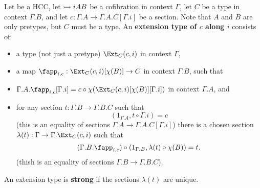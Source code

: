 \documentclass{amsart}
\begin{document}
\begin{defn}
  Let \E be a HCC, let $\rightarrowtail{i}{A}{B}$ be a cofibration in context $\Gamma$, let $C$ be a type in context $\Gamma.B$, and let $c:\Gamma.A \to \Gamma.A.C[\Gamma.i]$ be a section.
  Note that $A$ and $B$ are only pretypes, but $C$ must be a type.
  An \textbf{extension type of $c$ along $i$} consists of:
  \begin{itemize}
  \item a type (not just a pretype) $\Ext_{C}(c,i)$ in context $\Gamma$,
  \item a map $\fapp_{i,c} : \Ext_C(c,i)[\chi(B)] \to C$ in context $\Gamma.B$, such that
  \item $\Gamma.A.\fapp_{i,c}[\Gamma.i] = c \circ \chi(\Ext_C(c,i)[\chi(B)][\Gamma.i])$ in context $\Gamma.A$, and
  \item for any section $t:\Gamma.B \to \Gamma.B.C$ such that
    \[(1_{\Gamma.A},t \circ \Gamma.i) = c\]
    (this is an equality of sections $\Gamma.A \to \Gamma.A.C[\Gamma.i]$) there is a chosen section $\lambda(t) : \Gamma \to \Gamma.\Ext_C(c,i)$ such that
    \[(\Gamma.B.\fapp_{i,c}) \circ (1_{\Gamma.B},\lambda(t) \circ \chi(B)) = t.\]
    (thish is an equality of sections $\Gamma.B \to \Gamma.B.C$).
  \end{itemize}
  An extension type is \textbf{strong} if the sections $\lambda(t)$ are unique.
\end{defn}
\end{document}
